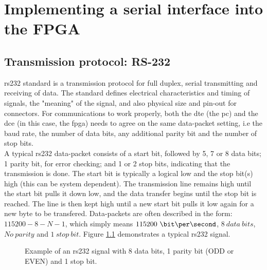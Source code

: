 \documentclass[main.tex]{subfiles}
\begin{document}
\chapter{Implementing a serial interface into the FPGA}

\section{Transmission protocol: RS-232}

\gls{rs232} standard is a transmission protocol for full duplex, serial transmitting and receiving of data. The standard defines electrical characteristics and timing of signals, the "meaning" of the signal, and also physical size and pin-out for connectors.
For communications to work properly, both the \gls{dte} (the \gls{pc}) and  the \gls{dce} (in this case, the \gls{fpga}) needs to agree on the same data-packet setting, i.e the baud rate, the number of data bits, any additional parity bit and the number of stop bits.\\

A typical \gls{rs232} data-packet consists of a start bit, followed by 5, 7 or 8 data bits; 1 parity bit, for error checking; and 1 or 2 stop bits, indicating that the transmission is done. The start bit is typically a logical low and the stop bit(s) high (this can be system dependent). The transmission line remains high until the start bit pulls it down low, and the data transfer begins until the stop bit is reached. The line is then kept high until a new start bit pulls it low again for a new byte to be transfered. Data-packets are often described in the form: $115200-8-N-1$, which simply means $115200~ \bit\per\second$, $8~ data~ bits$, $No~ parity$ and $1~ stop~ bit$. Figure \ref{fig:rs232} demonstrates a typical \gls{rs232} signal.\\

\begin{figure}[!h]
\begin{center}

\caption{Example of an \gls{rs232} signal with 8 data bits, 1 parity bit (ODD or EVEN) and 1 stop bit.}
\label{fig:rs232}

\end{center}
\end{figure}
\end{document}
